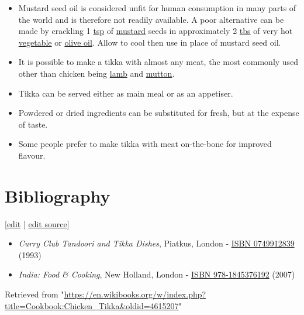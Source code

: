 \documentclass[11pt,a4paper]{article}
\begin{document}
\begin{itemize}
\item Mustard seed oil is considered unfit for human consumption in many parts of the world and is therefore not readily available. A poor alternative can be made by crackling 1 \href{https://en.wikibooks.org/wiki/Cookbook:Teaspoon}{tsp} of \href{https://en.wikibooks.org/wiki/Cookbook:Mustard}{mustard} seeds in approximately 2 \href{https://en.wikibooks.org/wiki/Cookbook:Tablespoon}{tbs} of very hot \href{https://en.wikibooks.org/wiki/Cookbook:Vegetable\_Oil}{vegetable} or \href{https://en.wikibooks.org/wiki/Cookbook:Olive\_Oil}{olive oil}. Allow to cool then use in place of mustard seed oil.
\item It is possible to make a tikka with almost any meat, the most commonly used other than chicken being \href{https://en.wikibooks.org/wiki/Cookbook:Lamb}{lamb} and \href{https://en.wikibooks.org/wiki/Cookbook:Mutton}{mutton}.
\item Tikka can be served either as main meal or as an appetiser.
\item Powdered or dried ingredients can be substituted for fresh, but at the expense of taste.
\item Some people prefer to make tikka with meat on-the-bone for improved flavour.
\end{itemize}

\section{Bibliography}

[\href{https://en.wikibooks.org/w/index.php?title=Cookbook:Chicken\_Tikka\&veaction=edit\&section=4}{edit} | \href{https://en.wikibooks.org/w/index.php?title=Cookbook:Chicken\_Tikka\&action=edit\&section=4}{edit source}]

\begin{itemize}
\item \textit{Curry Club Tandoori and Tikka Dishes}, Piatkus, London - \href{https://en.wikibooks.org/wiki/Special:BookSources/0749912839}{ISBN 0749912839} (1993)
\item \textit{India: Food \& Cooking}, New Holland, London - \href{https://en.wikibooks.org/wiki/Special:BookSources/978-1845376192}{ISBN 978-1845376192} (2007)
\end{itemize}

Retrieved from "\href{https://en.wikibooks.org/w/index.php?title=Cookbook:Chicken\_Tikka\&oldid=4615207}{https://en.wikibooks.org/w/index.php?title=Cookbook:Chicken\_Tikka\&oldid=4615207}"
\end{document}
